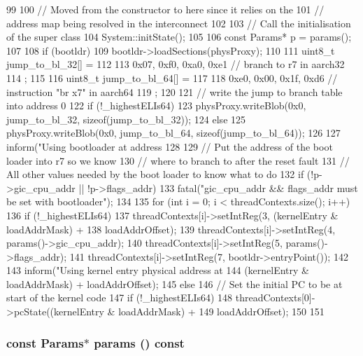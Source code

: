 \begin{DoxyCode}
99 {
100     // Moved from the constructor to here since it relies on the
101     // address map being resolved in the interconnect
102 
103     // Call the initialisation of the super class
104     System::initState();
105 
106     const Params* p = params();
107 
108     if (bootldr) {
109         bootldr->loadSections(physProxy);
110 
111         uint8_t jump_to_bl_32[] =
112         {
113             0x07, 0xf0, 0xa0, 0xe1  // branch to r7 in aarch32
114         };
115 
116         uint8_t jump_to_bl_64[] =
117         {
118             0xe0, 0x00, 0x1f, 0xd6  // instruction "br x7" in aarch64
119         };
120 
121         // write the jump to branch table into address 0
122         if (!_highestELIs64)
123             physProxy.writeBlob(0x0, jump_to_bl_32, sizeof(jump_to_bl_32));
124         else
125             physProxy.writeBlob(0x0, jump_to_bl_64, sizeof(jump_to_bl_64));
126 
127         inform("Using bootloader at address %
128 
129         // Put the address of the boot loader into r7 so we know
130         // where to branch to after the reset fault
131         // All other values needed by the boot loader to know what to do
132         if (!p->gic_cpu_addr || !p->flags_addr)
133             fatal("gic_cpu_addr && flags_addr must be set with bootloader\n");
134 
135         for (int i = 0; i < threadContexts.size(); i++) {
136             if (!_highestELIs64)
137                 threadContexts[i]->setIntReg(3, (kernelEntry & loadAddrMask) +
138                         loadAddrOffset);
139             threadContexts[i]->setIntReg(4, params()->gic_cpu_addr);
140             threadContexts[i]->setIntReg(5, params()->flags_addr);
141             threadContexts[i]->setIntReg(7, bootldr->entryPoint());
142         }
143         inform("Using kernel entry physical address at %
144                (kernelEntry & loadAddrMask) + loadAddrOffset);
145     } else {
146         // Set the initial PC to be at start of the kernel code
147         if (!_highestELIs64)
148             threadContexts[0]->pcState((kernelEntry & loadAddrMask) +
149                     loadAddrOffset);
150     }
151 }
\end{DoxyCode}
\hypertarget{classArmSystem_acd3c3feb78ae7a8f88fe0f110a718dff}{
\subsubsection[{params}]{\setlength{\rightskip}{0pt plus 5cm}const {\bf Params}$\ast$ params () const}}
\label{classArmSystem_acd3c3feb78ae7a8f88fe0f110a718dff}



